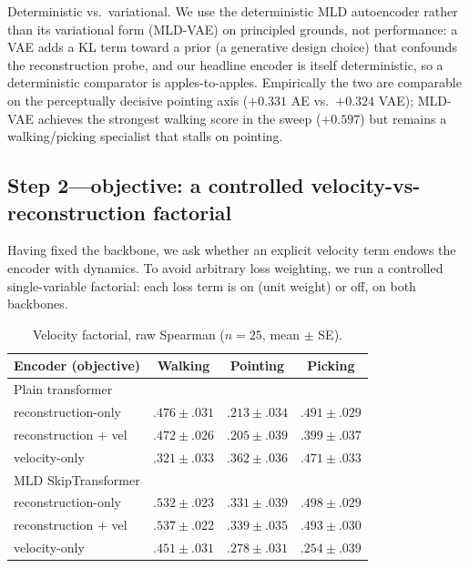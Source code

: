 \documentclass[letterpaper]{article} %
\begin{document}
{Deterministic vs.\ variational.} We use the {deterministic} MLD autoencoder rather
than its variational form (MLD-VAE) on principled grounds, not performance: a VAE adds a KL term
toward a prior (a generative design choice) that confounds the reconstruction probe, and our
headline encoder is itself deterministic, so a deterministic comparator is apples-to-apples.
Empirically the two are comparable on the perceptually decisive pointing axis ($+0.331$ AE vs.\
$+0.324$ VAE); MLD-VAE achieves the strongest walking score in the sweep ($+0.597$) but remains a
walking/picking specialist that stalls on pointing.

\subsection{Step 2---objective: a controlled velocity-vs-reconstruction factorial}
Having fixed the backbone, we ask whether an explicit {velocity} term endows the encoder
with dynamics. To avoid arbitrary loss weighting, we run a {controlled single-variable
factorial}: each loss term is on (unit weight) or off, on {both} backbones.

\begin{table}[h]
\centering
\setlength{\tabcolsep}{1pt}
\small
\caption{Velocity factorial, raw Spearman ($n=25$, mean $\pm$ SE).}
\begin{tabular}{lccc}
\toprule
Encoder (objective) & Walking & Pointing & Picking \\
\midrule
\multicolumn{4}{l}{{Plain transformer}} \\
\quad reconstruction-only & $.476{\scriptstyle\pm}.031$ & $.213{\scriptstyle\pm}.034$ & $.491{\scriptstyle\pm}.029$ \\
\quad reconstruction $+$ vel & $.472{\scriptstyle\pm}.026$ & $.205{\scriptstyle\pm}.039$ & $.399{\scriptstyle\pm}.037$ \\
\quad velocity-only & $.321{\scriptstyle\pm}.033$ & $.362{\scriptstyle\pm}.036$ & $.471{\scriptstyle\pm}.033$ \\
\multicolumn{4}{l}{{MLD SkipTransformer}} \\
\quad reconstruction-only & $.532{\scriptstyle\pm}.023$ & $.331{\scriptstyle\pm}.039$ & $.498{\scriptstyle\pm}.029$ \\
\quad reconstruction $+$ vel & $.537{\scriptstyle\pm}.022$ & $.339{\scriptstyle\pm}.035$ & $.493{\scriptstyle\pm}.030$ \\
\quad velocity-only & $.451{\scriptstyle\pm}.031$ & $.278{\scriptstyle\pm}.031$ & $.254{\scriptstyle\pm}.039$ \\
\bottomrule
\end{tabular}
\end{table}
\end{document}
